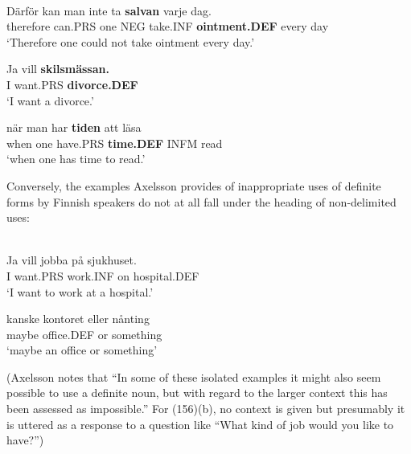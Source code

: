 
\ea\label{}
\\
\gll Därför  kan  man  inte  ta  \textbf{salvan} varje  dag.  \\
therefore  can.PRS  one  NEG  take.INF  \textbf{ointment.DEF} every  day  \\
\glt ‘Therefore one could not take ointment every day.’

\z

\ea
\gll Ja  vill  \textbf{skilsmässan.}\\
I  want.PRS  \textbf{divorce.DEF}\\
\glt  ‘I want a divorce.’

\z

\ea
\gll när  man  har  \textbf{tiden} att  läsa  \\
when  one  have.PRS  \textbf{time.DEF} INFM  read  \\
\glt ‘when one has time to read.’

\z

Conversely, the examples Axelsson provides of inappropriate uses of definite forms by Finnish speakers do not at all fall under the heading of non-delimited uses:


\ea\label{}
\\
\gll Ja  vill  jobba  på  sjukhuset.\\
I  want.PRS  work.INF  on  hospital.DEF\\
\glt ‘I want to work at a hospital.’

\z

\ea
\gll kanske  kontoret  eller  nånting\\
maybe  office.DEF  or  something\\
\glt ‘maybe an office or something’ 

\z

(Axelsson notes that “In some of these isolated examples it might also seem possible to use a definite noun, but with regard to the larger context this has been assessed as impossible.” For (156)(b), no context is given but presumably it is uttered as a response to a question like “What kind of job would you like to have?”)

